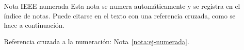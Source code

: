 \begin{nota}
  \begin{notaieee}{Nota IEEE numerada}
  Esta nota se numera automáticamente y se registra en el índice de notas. Puede citarse en el texto con una referencia cruzada, como se hace a continuación.
  \end{notaieee}
  \caption{Ejemplo de nota numerada con \texttt{nota} y \texttt{notaieee}.}
  \label{nota:ej-numerada}
\end{nota}

Referencia cruzada a la numeración: Nota~\ref{nota:ej-numerada}.

